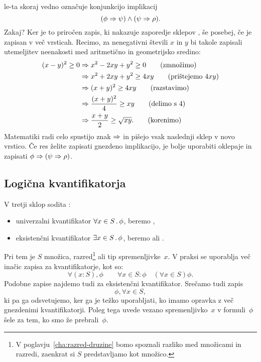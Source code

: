 %
le-ta skoraj vedno označuje konjunkcijo implikacij
%
\begin{equation*}
  (\phi \Rightarrow \psi) \land (\psi \Rightarrow \rho).
\end{equation*}
%
Zakaj? Ker je to priročen zapis, ki nakazuje zaporedje sklepov
, še posebej,
če je zapisan v več vrsticah. Recimo, za nenegativni števili $x$ in
$y$ bi takole zapisali utemeljitev neenakosti med aritmetično in
geometrijsko sredino:
%
\begin{align*}
  (x - y)^2 \geq 0
  &\Rightarrow x^2 - 2 x y + y^2 \geq 0
  \tag{zmnožimo}\\
  &\Rightarrow x^2 + 2 x y + y^2 \geq 4 x y
  \tag{prištejemo $4 x y$}\\
  &\Rightarrow (x + y)^2 \geq 4 x y
  \tag{razstavimo}\\
  &\Rightarrow \frac{(x + y)^2}{4} \geq x y
  \tag{delimo s $4$}\\
  &\Rightarrow \frac{x+y}{2} \geq \sqrt{x y}.
  \tag{korenimo}
\end{align*}
%
Matematiki radi celo spustijo znak $\Rightarrow$ in pišejo vsak naslednji sklep v novo vrstico.
%
Če res želite zapisati gnezdeno implikacijo, je bolje uporabiti oklepaje in zapisati $\phi \Rightarrow (\psi
\Rightarrow \rho)$.




\subsection{Logična kvantifikatorja}
\label{sec:logina-kvant}





V tretji sklop sodita :
%
\begin{itemize}
\item univerzalni kvantifikator $\forall x \in S \,.\, \phi$, beremo ,
\item eksistenčni kvantifikator $\exists x \in S \,.\, \phi$, beremo  ali .
\end{itemize}
%
Pri tem je $S$ množica, razred\footnote{V poglavju~\ref{cha:razred-druzine}
  bomo spoznali razliko med množicami in razredi, zaenkrat si $S$
  predstavljamo kot množico.} ali tip spremenljivke~$x$. V praksi se
uporablja več inačic zapisa za kvantifikatorje, kot so:
%
\begin{equation*}
  \forall (x : S) , \phi
  \qquad
  \forall x \in S : \phi
  \quad
  (\forall x \in S) \phi.
\end{equation*}
%
Podobne zapise najdemo tudi za eksistenčni kvantifikator.
%
Srečamo tudi zapis
%
\begin{equation*}
  \phi, \forall x \in S,
\end{equation*}
%
ki pa ga odsvetujemo, ker ga je težko uporabljati, ko imamo opravka z več gnezdenimi kvantifikatorji.
%
Poleg tega uvede vezano spremenljivko~$x$ v formuli~$\phi$ šele za tem, ko smo že prebrali~$\phi$.

